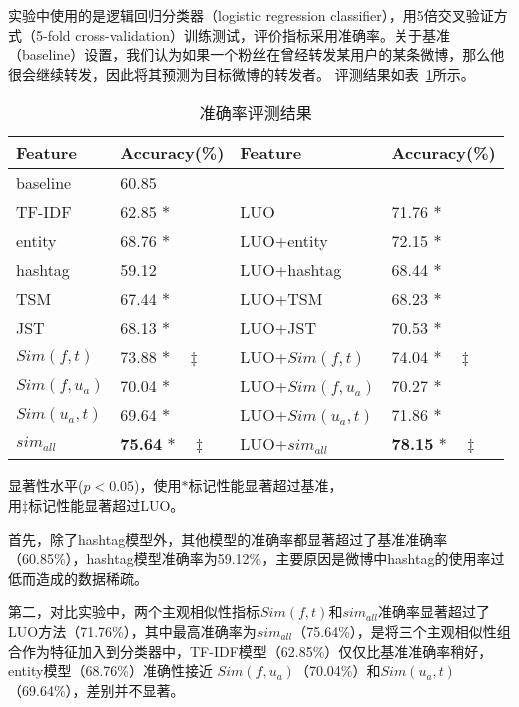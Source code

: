 实验中使用的是逻辑回归分类器（logistic regression classifier），用5倍交叉验证方式（5-fold cross-validation）训练测试，评价指标采用准确率。关于基准（baseline）设置，我们认为如果一个粉丝在曾经转发某用户的某条微博，那么他很会继续转发，因此将其预测为目标微博的转发者。
评测结果如表~\ref{tab6-6}所示。

\begin{table}[htb]
\centering
\caption{准确率评测结果}
\label{tab6-6}
\begin{tabular}{|l|l|l|l|}
\hline
Feature & Accuracy(\%) & Feature & Accuracy(\%)\\
\hline
baseline & 60.85 & & \\
\hline
TF-IDF & 62.85   $\ast$ & LUO & 71.76 $ \ast  $\\
entity & 68.76  $\ast$ & LUO+entity & 72.15 $\ast$\\
hashtag & 59.12  & LUO+hashtag & 68.44 $\ast$\\
\hline
TSM & 67.44 $\ast$ & LUO+TSM & 68.23 $\ast$\\
JST & 68.13 $\ast$ & LUO+JST & 70.53 $\ast$\\
\hline
$ Sim(f,t) $ & 73.88   $\ast  \quad \ddagger $ &LUO+$ Sim(f,t)$ & 74.04  $ \ast \quad \ddagger $\\
$ Sim(f,u_a)  $ & 70.04   $\ast  $ & LUO+$ Sim(f,u_a)$ & 70.27  $ \ast $\\
$ Sim(u_a,t)  $ & 69.64   $\ast  $ & LUO+$ Sim(u_a,t)$ & 71.86  $ \ast $\\
$ sim_{all}  $ & \textbf{75.64}   $\ast \quad \ddagger $ & LUO+$ sim_{all}  $ & \textbf{78.15}  $ \ast \quad \ddagger $\\
\hline
\end{tabular}
\begin{tablenotes}
  \centering
  \footnotesize
\item 显著性水平($p < 0.05$)，使用$ \ast $标记性能显著超过基准，\\用$ \ddagger $标记性能显著超过LUO。
\end{tablenotes}
\end{table}

首先，除了hashtag模型外，其他模型的准确率都显著超过了基准准确率（60.85\%），hashtag模型准确率为59.12\%，主要原因是微博中hashtag的使用率过低而造成的数据稀疏。

第二，对比实验中，两个主观相似性指标$ Sim(f,t) $和$ sim_{all}  $准确率显著超过了LUO方法（71.76\%），其中最高准确率为$ sim_{all}  $（75.64\%），是将三个主观相似性组合作为特征加入到分类器中，TF-IDF模型（62.85\%）仅仅比基准准确率稍好，entity模型（68.76\%）准确性接近 $ Sim(f,u_a)$（70.04\%）和$ Sim(u_a,t)  $（69.64\%），差别并不显著。

